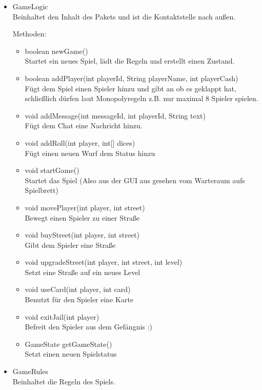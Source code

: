 \documentclass[a4paper,10pt]{article}
\begin{document}
\begin{itemize}
\item GameLogic \\
Beinhaltet den Inhalt des Pakets und ist die Kontaktstelle nach außen.

Methoden:
\begin{itemize}
\item boolean newGame()
\\Startet ein neues Spiel, lädt die Regeln und erstellt einen Zustand.
\item boolean addPlayer(int playerId, String playerName, int playerCash)
\\Fügt dem Spiel einen Spieler hinzu und gibt an ob es geklappt hat, schließlich dürfen laut Monopolyregeln z.B. nur maximal 8 Spieler spielen.
\item void addMessage(int messageId, int playerId, String text)
\\Fügt dem Chat eine Nachricht hinzu.
\item void addRoll(int player, int[] dices)
\\Fügt einen neuen Wurf dem Status hinzu
\item void startGame()
\\Startet das Spiel (Also aus der GUI aus gesehen vom Warteraum aufs Spielbrett)
\item void movePlayer(int player, int street)
\\Bewegt einen Spieler zu einer Straße
\item void buyStreet(int player, int street)
\\Gibt dem Spieler eine Straße
\item void upgradeStreet(int player, int street, int level)
\\Setzt eine Straße auf ein neues Level
\item void useCard(int player, int card)
\\Benutzt für den Spieler eine Karte
\item void exitJail(int player)
\\Befreit den Spieler aus dem Gefängnis :)
\item GameState getGameState()
\\Setzt einen neuen Spielstatus

\end{itemize} %

\item GameRules \\
Beinhaltet die Regeln des Spiels.


\end{itemize}
\end{document}
